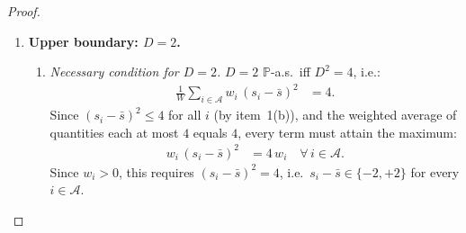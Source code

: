 \documentclass[12pt,openany]{book}
\newcommand{\Prob}{\mathbb{P}}
\numberwithin{equation}{chapter}
\theoremstyle{plain}
\theoremstyle{definition}
\theoremstyle{remark}
\numberwithin{equation}{chapter}
\theoremstyle{plain}
\begin{document}
\begin{proof}
\begin{enumerate}
\begin{enumerate}
    \item \emph{($\Leftarrow$) $s_i = \bar{s}$ for all
      $i \in \mathcal{A}$ implies $D = 0$.}
      If $s_i = c$ for some constant $c \in [-1,1]$ and
      all $i \in \mathcal{A}$, then:
      \begin{align}
        \bar{s}
          &= \frac{1}{W}\sum_{i \in \mathcal{A}} w_i\, c
           = \frac{cW}{W}
           = c,
        \\[4pt]
        D^2
          &= \frac{1}{W}\sum_{i \in \mathcal{A}}
              w_i\,(c - c)^2
           = 0,
        \\[4pt]
        D &= 0.
      \end{align}

    \item \emph{Special case $|\mathcal{A}| = 1$.}
      With a single active agent, $\bar{s} = s_1$ trivially,
      so $D = 0$ regardless of the value of $s_1 \in [-1,1]$.
  \end{enumerate}

  \item \textbf{Upper boundary: $D = 2$.}

  \begin{enumerate}
    \item \emph{Necessary condition for $D = 2$.}
      $D = 2$ $\Prob$-a.s.\ iff $D^2 = 4$, i.e.:
      \begin{align}
        \frac{1}{W}\sum_{i \in \mathcal{A}}
          w_i\,(s_i - \bar{s})^2
          &= 4.
      \end{align}
      Since $(s_i - \bar{s})^2 \leq 4$ for all $i$
      (by item~1(b)), and the weighted average of
      quantities each at most $4$ equals $4$, every
      term must attain the maximum:
      \begin{align}
        w_i\,(s_i - \bar{s})^2 &= 4\,w_i
        \quad \forall\, i \in \mathcal{A}.
      \end{align}
      Since $w_i > 0$, this requires
      $(s_i - \bar{s})^2 = 4$, i.e.\
      $s_i - \bar{s} \in \{-2, +2\}$ for every
      $i \in \mathcal{A}$.


\end{enumerate}
\end{enumerate}
\end{proof}
\end{document}
